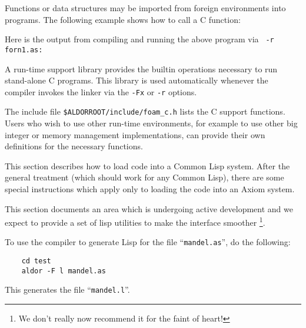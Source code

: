 

Functions or data structures may be imported from foreign environments
into \asharp{} programs.
The following example shows how to call a C function:

{\small

}

Here is the output from compiling and running the above program
via {\tt \asharpcmd{} -r forn1.as:}

{\small

}

A run-time support library provides the builtin operations necessary to
run stand-alone C programs.   This library is used automatically whenever
the compiler invokes the linker via the \verb"-Fx" or \verb"-r" options.

The include file {\tt \$ALDORROOT/include/foam\_c.h} lists
the C support functions.
Users who wish to use other run-time environments, for example
to use other big integer or memory management implementations, can
provide their own definitions for the necessary functions.


This section describes how to load \asharp{} code into a Common Lisp
system.  After the general treatment (which should work for any
Common Lisp), there are some special instructions which apply only
to loading the code into an {\sc Axiom} system.

This section documents an area which is undergoing active development
and we expect to provide a set of lisp utilities to make the interface smoother%
\footnote{We don't really now recommend it for the faint of heart!}.

To use the compiler to generate Lisp for the file ``{\tt mandel.as}'',
do the following:
\begin{verbatim}
    cd test
    aldor -F l mandel.as
\end{verbatim}
This generates the file ``{\tt mandel.l}''.

